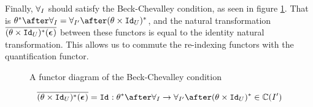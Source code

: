 \documentclass{Report}
\begin{document}
Finally, $\forall_I$ should satisfy the Beck-Chevalley condition, as seen in figure \ref{BeckChevalleyDiagram}. That is $\theta\star\after\allI = \allII\after(\theta\times\Id{U})\star$, and the natural transformation $\overline{(\theta\times\texttt{Id}_{U})^*(\boldsymbol{\epsilon}_{})}$ between these functors is equal to the identity natural transformation. This allows us to commute the re-indexing functors with the quantification functor.

\begin{figure}
    \begin{framed}
        \centering
    \end{framed}
    \caption{A functor diagram of the Beck-Chevalley condition}
    \label{BeckChevalleyDiagram}
\end{figure}

\begin{align*}
    \bar{(\theta\times\Id{U})\star(\counit{})} = \Id{}: \theta\star\after\allI \rightarrow \allII\after(\theta\times\Id{U})\star\in \C(I')
\end{align*}
\end{document}
